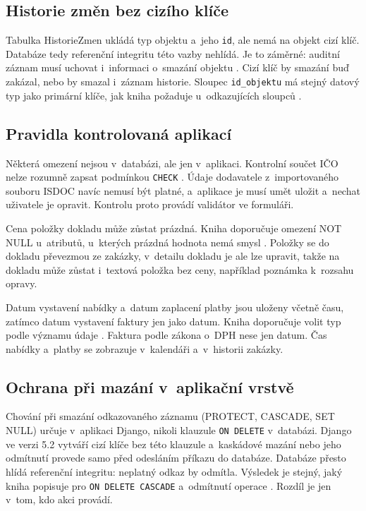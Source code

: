 \subsection{Historie změn bez cizího klíče}

Tabulka HistorieZmen ukládá typ objektu a~jeho \texttt{id}, ale nemá na objekt cizí klíč. Databáze tedy referenční integritu této vazby nehlídá. Je to záměrné: auditní záznam musí uchovat i~informaci o~smazání objektu \cite[s.~445]{Silberschatz2020}. Cizí klíč by smazání buď zakázal, nebo by smazal i~záznam historie. Sloupec \texttt{id\_objektu} má stejný datový typ jako primární klíče, jak kniha požaduje u~odkazujících sloupců \cite[s.~149]{Silberschatz2020}.

\subsection{Pravidla kontrolovaná aplikací}

Některá omezení nejsou v~databázi, ale jen v~aplikaci. Kontrolní součet IČO nelze rozumně zapsat podmínkou \texttt{CHECK} \cite[s.~147]{Silberschatz2020}. Údaje dodavatele z~importovaného souboru ISDOC navíc nemusí být platné, a~aplikace je musí umět uložit a~nechat uživatele je opravit. Kontrolu proto provádí validátor ve formuláři.

Cena položky dokladu může zůstat prázdná. Kniha doporučuje omezení NOT NULL u~atributů, u~kterých prázdná hodnota nemá smysl \cite[s.~146]{Silberschatz2020}. Položky se do dokladu převezmou ze zakázky, v~detailu dokladu je ale lze upravit, takže na dokladu může zůstat i~textová položka bez ceny, například poznámka k~rozsahu opravy.

Datum vystavení nabídky a~datum zaplacení platby jsou uloženy včetně času, zatímco datum vystavení faktury jen jako datum. Kniha doporučuje volit typ podle významu údaje \cite[s.~154]{Silberschatz2020}. Faktura podle zákona o~DPH nese jen datum. Čas nabídky a~platby se zobrazuje v~kalendáři a~v~historii zakázky.

\subsection{Ochrana při mazání v~aplikační vrstvě}

Chování při smazání odkazovaného záznamu (PROTECT, CASCADE, SET NULL) určuje v~aplikaci Django, nikoli klauzule \texttt{ON DELETE} v~databázi. Django ve verzi 5.2 vytváří cizí klíče bez této klauzule a~kaskádové mazání nebo jeho odmítnutí provede samo před odesláním příkazu do databáze. Databáze přesto hlídá referenční integritu: neplatný odkaz by odmítla. Výsledek je stejný, jaký kniha popisuje pro \texttt{ON DELETE CASCADE} a~odmítnutí operace \cite[s.~149--150]{Silberschatz2020}. Rozdíl je jen v~tom, kdo akci provádí.
